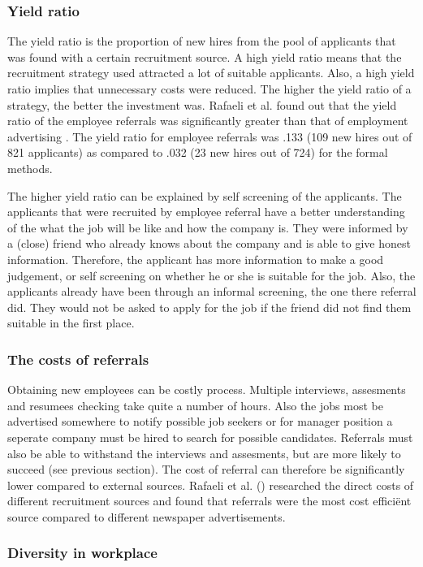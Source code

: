 \documentclass[Main.tex]{subfiles}
\begin{document}
\subsubsection*{Yield ratio}
The yield ratio is the proportion of new hires from the pool of applicants that was found with a certain recruitment source. A high yield ratio means that the recruitment strategy used attracted a lot of suitable applicants. Also, a high yield ratio implies that unnecessary costs were reduced. The higher the yield ratio of a strategy, the better the investment was. 
Rafaeli et al. found out that the yield ratio of the employee referrals was significantly greater than that of employment advertising \cite{fourth}. The yield ratio for employee referrals was .133 (109 new
hires out of 821 applicants) as compared to .032 (23 new hires out of 724) for the formal methods. 

The higher yield ratio can be explained by self screening of the applicants. The applicants that were recruited by employee referral have a better understanding of the what the job will be like and how the company is. They were informed by a (close) friend who already knows about the company and is able to give honest information. Therefore, the applicant has more information to make a good judgement, or self screening on whether he or she is suitable for the job. Also, the applicants already have been through an informal screening, the one there referral did. They would not be asked to apply for the job if the friend did not find them suitable in the first place. 

\subsubsection*{The costs of referrals}

Obtaining new employees can be costly process. Multiple interviews, assesments and resumees checking take quite a number of hours. Also the jobs most be advertised somewhere to notify possible job seekers or for manager position a seperate company must be hired to search for possible candidates. Referrals  must also be able to withstand the interviews and assesments, but are more likely to succeed (see previous section). The cost of referral can therefore be significantly lower compared to external sources. Rafaeli et al. (\cite{fourth}) researched the direct costs of different recruitment sources and found that referrals were the most cost efficiënt source compared to different newspaper advertisements.


\subsubsection*{Diversity in workplace}
\end{document}
